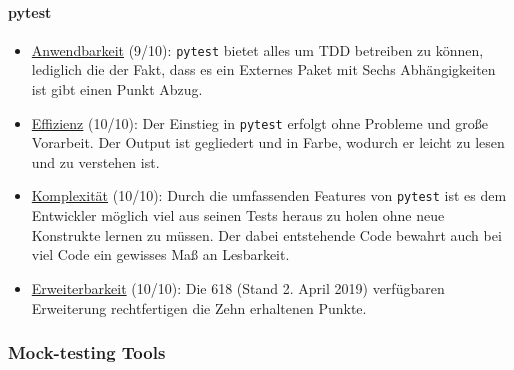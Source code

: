 \paragraph{pytest}\label{zusammenfassung:unit:pytest}\mbox{}
\newline
\begin{itemize}
    \item \underline{Anwendbarkeit} (9/10):\newline
    \lstinline{pytest} bietet alles um TDD betreiben zu können, lediglich die
    der Fakt, dass es ein Externes Paket mit Sechs Abhängigkeiten ist gibt einen
    Punkt Abzug.
    
    \item \underline{Effizienz} (10/10):\newline
    Der Einstieg in \lstinline{pytest} erfolgt ohne Probleme und große
    Vorarbeit. Der Output ist gegliedert und in Farbe, wodurch er leicht zu
    lesen und zu verstehen ist.
    
    \item \underline{Komplexität} (10/10):\newline
    Durch die umfassenden Features von \lstinline{pytest} ist es dem Entwickler
    möglich viel aus seinen Tests heraus zu holen ohne neue Konstrukte lernen zu
    müssen. Der dabei entstehende Code bewahrt auch bei viel Code ein gewisses
    Maß an Lesbarkeit.
    
    \item \underline{Erweiterbarkeit} (10/10):\newline
    Die 618 (Stand 2. April 2019) verfügbaren Erweiterung rechtfertigen die Zehn
    erhaltenen Punkte.
\end{itemize}

\subsubsection{Mock-testing Tools}\label{zusammenfassung:mock}

